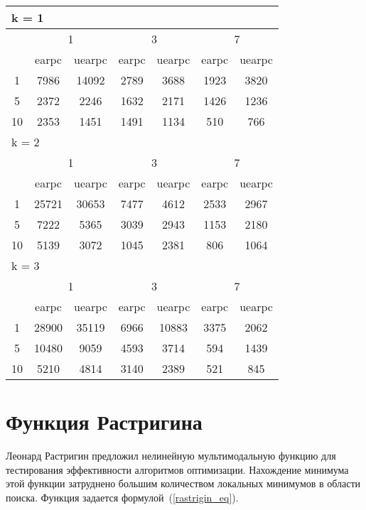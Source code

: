 \begin{table}
 \begin{tabular}{|*7{c|}}
\hline
\multicolumn{7}{|l|}{k = 1} \\
\hline
\multirow{2}{*}{\diagbox{$\mu$}{$\lambda$}} & \multicolumn{2}{c|}{1} & \multicolumn{2}{c|}{3} & \multicolumn{2}{c|}{7} \\
\cline{2-7}
 & earpc & uearpc & earpc & uearpc & earpc & uearpc \\
\hline
1 & 7986 & 14092 & 2789 & 3688 & 1923 & 3820 \\
\hline
5 & 2372 & 2246 & 1632 & 2171 & 1426 & 1236 \\
\hline
10 & 2353 & 1451 & 1491 & 1134 & 510 & 766 \\
\hline
\multicolumn{7}{|l|}{k = 2} \\
\hline
\multirow{2}{*}{\diagbox{$\mu$}{$\lambda$}} & \multicolumn{2}{c|}{1} & \multicolumn{2}{c|}{3} & \multicolumn{2}{c|}{7} \\
\cline{2-7}
 & earpc & uearpc & earpc & uearpc & earpc & uearpc \\
\hline
1 & 25721 & 30653 & 7477 & 4612 & 2533 & 2967 \\
\hline
5 & 7222 & 5365 & 3039 & 2943 & 1153 & 2180 \\
\hline
10 & 5139 & 3072 & 1045 & 2381 & 806 & 1064 \\
\hline
\multicolumn{7}{|l|}{k = 3} \\
\hline
\multirow{2}{*}{\diagbox{$\mu$}{$\lambda$}} & \multicolumn{2}{c|}{1} & \multicolumn{2}{c|}{3} & \multicolumn{2}{c|}{7} \\
\cline{2-7}
 & earpc & uearpc & earpc & uearpc & earpc & uearpc \\
\hline
1 & 28900 & 35119 & 6966 & 10883 & 3375 & 2062 \\
\hline
5 & 10480 & 9059 & 4593 & 3714 & 594 & 1439 \\
\hline
10 & 5210 & 4814 & 3140 & 2389 & 521 & 845 \\
\hline
\end{tabular}
\end{table}


\section{Функция Растригина}

Леонард Растригин предложил нелинейную мультимодальную функцию для тестирования эффективности алгоритмов оптимизации. Нахождение минимума этой функции затруднено большим количеством локальных минимумов в области поиска. Функция задается формулой~(\ref{rastrigin_eq}).

